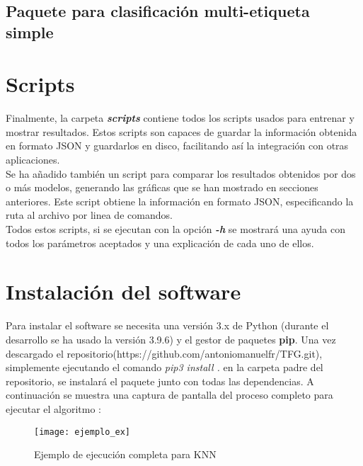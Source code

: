 \subsection{Paquete para clasificación multi-etiqueta simple}
\label{sec:sftw-mlc}
\section{Scripts}
Finalmente, la carpeta \textbf{\textit{scripts}} contiene todos los scripts usados para entrenar y mostrar resultados. Estos scripts son capaces de guardar la información obtenida en formato JSON y guardarlos en disco, facilitando así la integración con otras aplicaciones.\\
\linebreak
Se ha añadido también un script para comparar los resultados obtenidos por dos o más modelos, generando las gráficas que se han mostrado en secciones anteriores. Este script obtiene la información en formato JSON, especificando la ruta al archivo por linea de comandos. \\
\linebreak
Todos estos scripts, si se ejecutan con la opción \textbf{\textit{-h}} se mostrará una ayuda con todos los parámetros aceptados y una explicación de cada uno de ellos.
\section{Instalación del software}
Para instalar el software se necesita una versión 3.x de Python (durante el desarrollo se ha usado la versión 3.9.6) y el gestor de paquetes \textbf{pip}. Una vez descargado el repositorio(https://github.com/antoniomanuelfr/TFG.git), simplemente ejecutando el comando \textit{pip3 install .} en la carpeta padre del repositorio, se instalará el paquete junto con todas las dependencias.
A continuación se muestra una captura de pantalla del proceso completo para ejecutar el algoritmo :
 \begin{figure}[H]
    \texttt{[image: ejemplo\_ex]}
    \caption{Ejemplo de ejecución completa para KNN}
    \label{cap:ex}
\end{figure}